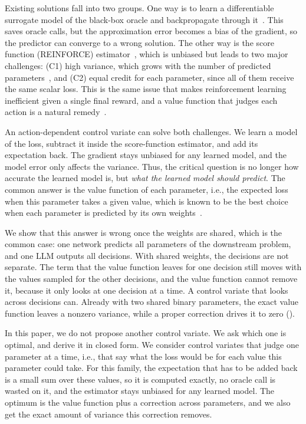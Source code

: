 \documentclass[10pt]{article}
\theoremstyle{plain}
\theoremstyle{definition}
\theoremstyle{remark}
\theoremstyle{definition}
\begin{document}
Existing solutions fall into two groups. One way is to learn a differentiable surrogate model of the black-box oracle and backpropagate through it~\cite{shah2022lodl,zharmagambetov2023lancer}. This saves oracle calls, but the approximation error becomes a bias of the gradient, so the predictor can converge to a wrong solution. The other way is the score function (REINFORCE) estimator~\cite{williams1992,silvestri2023}, which is unbiased but leads to two major challenges: (C1) high variance, which grows with the number of predicted parameters~\cite{tokui2017,SSM23}, and (C2) equal credit for each parameter, since all of them receive the same scalar loss. This is the same issue that makes reinforcement learning inefficient given a single final reward, and a value function that judges each action is a natural remedy~\cite{sutskever2025dwarkesh}.

An action-dependent control variate can solve both challenges. We learn a model of the loss, subtract it inside the score-function estimator, and add its expectation back. The gradient stays unbiased for any learned model, and the model error only affects the variance. Thus, the critical question is no longer how accurate the learned model is, but \emph{what the learned model should predict}. The common answer is the value function of each parameter, i.e., the expected loss when this parameter takes a given value, which is known to be the best choice when each parameter is predicted by its own weights~\cite{tokui2017}.

We show that this answer is wrong once the weights are shared, which is the common case: one network predicts all parameters of the downstream problem, and one LLM outputs all decisions. With shared weights, the decisions are not separate. The term that the value function leaves for one decision still moves with the values sampled for the other decisions, and the value function cannot remove it, because it only looks at one decision at a time. A control variate that looks across decisions can. Already with two shared binary parameters, the exact value function leaves a nonzero variance, while a proper correction drives it to zero ().

In this paper, we do not propose another control variate. We ask which one is optimal, and derive it in closed form. We consider control variates that judge one parameter at a time, i.e., that say what the loss would be for each value this parameter could take. For this family, the expectation that has to be added back is a small sum over these values, so it is computed exactly, no oracle call is wasted on it, and the estimator stays unbiased for any learned model. The optimum is the value function plus a correction across parameters, and we also get the exact amount of variance this correction removes.
\end{document}
